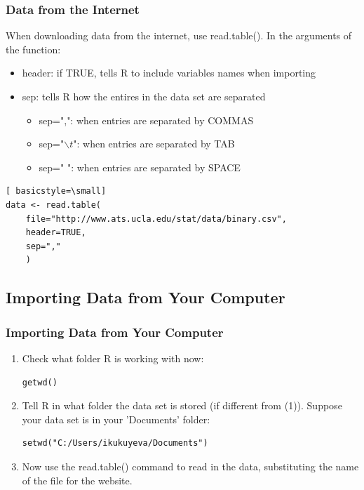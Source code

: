 \begin{frame}[fragile]
 \frametitle{Data from the Internet}

When downloading data from the internet, use \ttfamily read.table(). \normalfont  In the arguments of the function:
  \begin{itemize}
  \item \ttfamily header: \normalfont if TRUE, tells R to include variables names when importing
  \item \ttfamily sep: \normalfont tells R how the entires in the data set are separated
    \begin{itemize}
      \item \ttfamily sep=",": \normalfont when entries are separated by COMMAS
      \item \ttfamily sep="$\backslash t$": \normalfont when entries are separated by TAB
      \item \ttfamily sep=" ": \normalfont when entries are separated by SPACE
    \end{itemize}
   \end{itemize}
   	\begin{lstlisting}[ basicstyle=\small]
data <- read.table(
	file="http://www.ats.ucla.edu/stat/data/binary.csv", 
	header=TRUE, 
	sep=","
	)
	\end{lstlisting}
\normalfont
\normalsize
\end{frame}



\subsection{Importing Data from Your Computer}

\begin{frame}[fragile]
\frametitle{Importing Data from Your Computer}
    \begin{enumerate}
 	\item Check what folder R is working with now: \\
		\begin{lstlisting}
getwd()
		\end{lstlisting}

 	\item Tell R in what folder the data set is stored (if different from (1)).  Suppose your data set is in your 'Documents' folder: \\
	\begin{lstlisting}
setwd("C:/Users/ikukuyeva/Documents")
	\end{lstlisting}

	\item Now use the \ttfamily read.table() \normalfont command to read in the data, substituting the name of the file for the website.
    \end{enumerate}
\end{frame}

